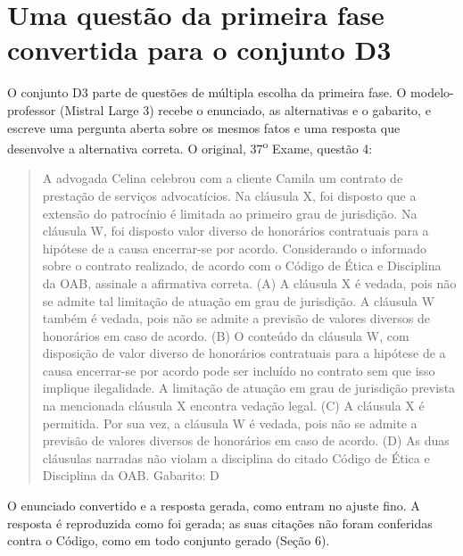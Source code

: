 \documentclass{IOS-Book-Article}
\begin{document}
\section{Uma questão da primeira fase convertida para o conjunto D3}
O conjunto D3 parte de questões de múltipla escolha da primeira fase. O modelo-professor (Mistral Large 3) recebe o enunciado, as alternativas e o gabarito, e escreve uma pergunta aberta sobre os mesmos fatos e uma resposta que desenvolve a alternativa correta. O original, 37\textsuperscript{o} Exame, questão 4:
\begin{quote}\footnotesize\ttfamily\raggedright
A advogada Celina celebrou com a cliente Camila um contrato de prestação de serviços advocatícios. Na cláusula X, foi disposto que a extensão do patrocínio é limitada ao primeiro grau de jurisdição. Na cláusula W, foi disposto valor diverso de honorários contratuais para a hipótese de a causa encerrar-se por acordo. Considerando o informado sobre o contrato realizado, de acordo com o Código de Ética e Disciplina da OAB, assinale a afirmativa correta.\newline
(A) A cláusula X é vedada, pois não se admite tal limitação de atuação em grau de jurisdição. A cláusula W também é vedada, pois não se admite a previsão de valores diversos de honorários em caso de acordo.\newline
(B) O conteúdo da cláusula W, com disposição de valor diverso de honorários contratuais para a hipótese de a causa encerrar-se por acordo pode ser incluído no contrato sem que isso implique ilegalidade. A limitação de atuação em grau de jurisdição prevista na mencionada cláusula X encontra vedação legal.\newline
(C) A cláusula X é permitida. Por sua vez, a cláusula W é vedada, pois não se admite a previsão de valores diversos de honorários em caso de acordo.\newline
(D) As duas cláusulas narradas não violam a disciplina do citado Código de Ética e Disciplina da OAB.\newline
Gabarito: D
\end{quote}
O enunciado convertido e a resposta gerada, como entram no ajuste fino. A resposta é reproduzida como foi gerada; as suas citações não foram conferidas contra o Código, como em todo conjunto gerado (Seção 6).
\end{document}
